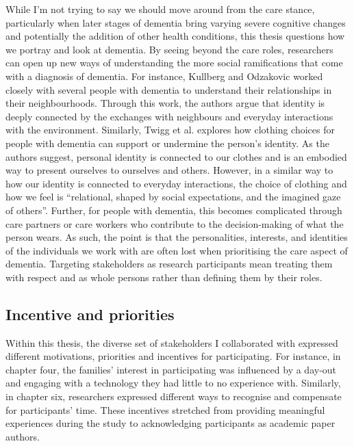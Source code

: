 While I'm not trying to say we should move around from the care stance, particularly when later stages of dementia bring varying severe cognitive changes and potentially the addition of other health conditions, this thesis questions how we portray and look at dementia. By seeing beyond the care roles, researchers can open up new ways of understanding the more social ramifications that come with a diagnosis of dementia. For instance, Kullberg and Odzakovic worked closely with several people with dementia to understand their relationships in their neighbourhoods. Through this work, the authors argue that identity is deeply connected by the exchanges with neighbours and everyday interactions with the environment. Similarly, Twigg et al. explores how clothing choices for people with dementia can support or undermine the person's identity. As the authors suggest, personal identity is connected to our clothes and is an embodied way to present ourselves to ourselves and others. However, in a similar way to how our identity is connected to everyday interactions, the choice of clothing and how we feel is ``relational, shaped by social expectations, and the imagined gaze of others''. Further, for people with dementia, this becomes complicated through care partners or care workers who contribute to the decision-making of what the person wears. As such, the point is that the personalities, interests, and identities of the individuals we work with are often lost when prioritising the care aspect of dementia. Targeting stakeholders as research participants mean treating them with respect and as whole persons rather than defining them by their roles.

\subsection{Incentive and priorities }
\label{incentive}
Within this thesis, the diverse set of stakeholders I collaborated with expressed different motivations, priorities and incentives for participating. For instance, in chapter four, the families' interest in participating was influenced by a day-out and engaging with a technology they had little to no experience with. Similarly, in chapter six, researchers expressed different ways to recognise and compensate for participants' time. These incentives stretched from providing meaningful experiences during the study to acknowledging participants as academic paper authors. 

